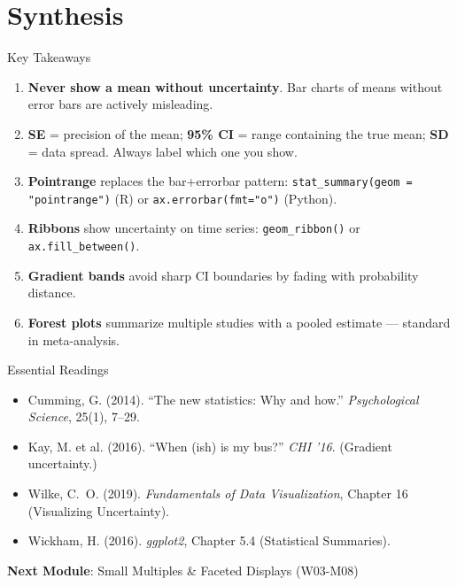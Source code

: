 \documentclass[10pt]{beamer}
\begin{document}
\section{Synthesis}

\begin{frame}{Key Takeaways}
  \begin{enumerate}
    \item \textbf{Never show a mean without uncertainty}. Bar charts of
          means without error bars are actively misleading.
    \item \textbf{SE} = precision of the mean; \textbf{95\% CI} = range
          containing the true mean; \textbf{SD} = data spread. Always
          label which one you show.
    \item \textbf{Pointrange} replaces the bar+errorbar pattern:
          \texttt{stat\_summary(geom = "pointrange")} (R) or
          \texttt{ax.errorbar(fmt="o")} (Python).
    \item \textbf{Ribbons} show uncertainty on time series:
          \texttt{geom\_ribbon()} or \texttt{ax.fill\_between()}.
    \item \textbf{Gradient bands} avoid sharp CI boundaries by fading
          with probability distance.
    \item \textbf{Forest plots} summarize multiple studies with a pooled
          estimate --- standard in meta-analysis.
  \end{enumerate}
\end{frame}

\begin{frame}{Essential Readings}
  \begin{itemize}
    \item Cumming, G. (2014). ``The new statistics: Why and how.''
          \emph{Psychological Science}, 25(1), 7--29.
    \item Kay, M. et al. (2016). ``When (ish) is my bus?''
          \emph{CHI '16}. (Gradient uncertainty.)
    \item Wilke, C.~O. (2019). \emph{Fundamentals of Data Visualization},
          Chapter 16 (Visualizing Uncertainty).
    \item Wickham, H. (2016). \emph{ggplot2}, Chapter 5.4
          (Statistical Summaries).
  \end{itemize}
  \vspace{6pt}
  \textbf{Next Module}: Small Multiples \& Faceted Displays (W03-M08)
\end{frame}
\end{document}
